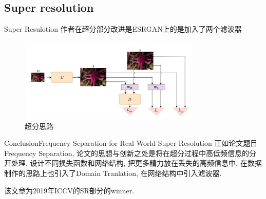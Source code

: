 \subsection{Super resolution}
\begin{frame}{Super Resulotion}
    作者在超分部分改进是ESRGAN上的是加入了两个滤波器
    \begin{figure}
        \centering
        \includegraphics[height=4cm]{pic/pic0103.jpg}
        \caption{超分思路}
        \label{fig:0103}
    \end{figure}
\end{frame}

\begin{frame}{Conclusion}{Frequency Separation for Real-World Super-Resolution}
    正如论文题目Frequency Separation, 论文的思想与创新之处是将在超分过程中高低频信息的分开处理, 设计不同损失函数和网络结构, 把更多精力放在丢失的高频信息中. 在数据制作的思路上也引入了Domain Tranlation, 在网络结构中引入滤波器.
    
    该文章为2019年ICCV的SR部分的winner.
\end{frame}



